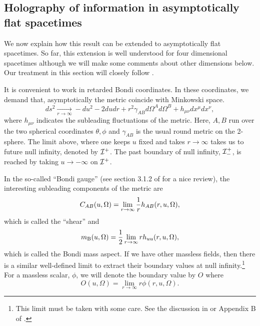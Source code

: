 \documentclass[12pt]{article}
\newcommand{\be}{\begin{equation}}
\newcommand{\ee}{\end{equation}}
\def \sph{{\Omega}}
\def \scrip{{\cal I}^{+}}
\def \scrippast{{\cal I}^{+}_{-}}
\def\maspect{m_{\text{B}}}
\begin{document}
\subsection{Holography of information in asymptotically flat spacetimes \label{holinfoflat}}
We now explain how this result can be extended to asymptotically flat spacetimes. So far, this extension is well understood for four dimensional spacetimes although we will make some comments about other dimensions below. Our treatment in this section will closely follow \cite{Laddha:2020kvp}. 

It is convenient to work in retarded Bondi coordinates. In these coordinates, we demand that, asymptotically the metric coincide with Minkowski space.
\be
ds^2 \underset{r \rightarrow \infty}{\longrightarrow}  - du^2 - 2 du dr + r^2 \gamma_{AB}d \sph^{A} d \sph^{B}  + h_{\mu \nu} d x^{\mu} d x^{\nu},
\ee
where $h_{\mu \nu}$ indicates the subleading fluctuations of the metric. Here, $A,B$ run over the two spherical coordinates $\theta, \phi$ and $\gamma_{AB}$ is the usual round metric on the 2-sphere. The limit above, where one keeps $u$ fixed and takes $r \rightarrow \infty$ takes us to future null infinity, denoted by $\scrip$.  The past boundary of null infinity, $\scrippast$, is reached by taking $u \rightarrow -\infty$ on $\scrip$.


In the so-called ``Bondi gauge'' (see section 3.1.2 of \cite{Compere:2018aar} for a nice review), the interesting subleading components of the metric are
\be
C_{AB}(u, \Omega) = \lim_{r \rightarrow \infty} {1 \over r} h_{AB}(r, u, \Omega),
\ee
which is called the ``shear'' and
\be
\maspect(u, \Omega) = {1 \over 2} \lim_{r \rightarrow \infty} r h_{u u}(r, u, \Omega),
\ee
which is called the Bondi mass aspect. If we have other massless fields, then there is a similar well-defined limit to extract their boundary values at null infinity.\footnote{This limit must be taken with some care. See the discussion in \cite{Strominger:2017zoo} or Appendix B of \cite{Ghosh:2017pel}.} For a massless scalar, $\phi$, we
will denote the boundary value by $O$ where
\be
O(u, \Omega) = \lim_{r \rightarrow \infty} r \phi(r, u, \Omega).
\ee
\end{document}
